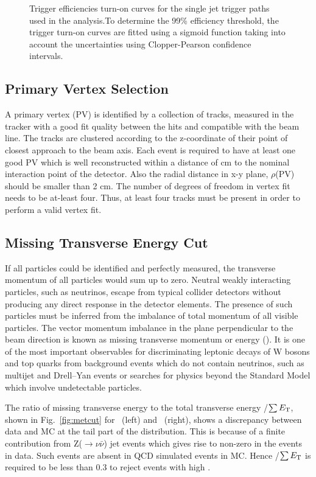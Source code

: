 \begin{figure}[!htbp]
\begin{center}
 \caption{Trigger efficiencies turn-on curves for the single jet trigger paths used in the analysis.To determine the 99\% efficiency threshold, the trigger turn-on curves are fitted using a sigmoid function taking into account the uncertainties using Clopper-Pearson confidence intervals.}
 \label{fig:trig_eff}
 \end{center}
\end{figure}

\subsection{Primary Vertex Selection}
A primary vertex (PV) is identified by a collection of tracks, measured in the tracker with a good fit quality between the hits and compatible with the beam line. The tracks are clustered according to the z-coordinate of their point of closest approach to the beam axis. Each event is required to have at least one good PV which is well reconstructed within a distance of  cm to the nominal interaction point of the detector. Also the radial distance in x-y plane, $\rho$(PV) should be smaller than 2 cm. The number of degrees of freedom in vertex fit needs to be at-least four. Thus, at least four tracks must be present in order to perform a valid vertex fit.

\subsection{Missing Transverse Energy Cut}
If all particles could be identified and perfectly measured, the transverse momentum of all particles would sum up to zero. Neutral weakly interacting particles, such as neutrinos, escape from typical collider detectors without producing any direct response in the detector elements. The presence of such particles must be inferred from the imbalance of total momentum of all visible particles. The vector momentum imbalance in the plane perpendicular to the beam direction is known as missing transverse momentum or energy (\ETmiss). It is one of the most important observables for discriminating leptonic decays of W bosons and top quarks from background events which do not contain neutrinos, such  as multijet and Drell–Yan events or searches for physics beyond the Standard Model which involve undetectable particles.

The ratio of missing transverse energy to the total transverse energy \ETmiss/$\sum E_{\mathrm{T}}$, shown in Fig.~\ref{fig:metcut} for \njt~(left) and \njth~(right), shows a discrepancy between data and MC at the tail part of the distribution. This is because of a  finite contribution from Z($\rightarrow \nu \bar{\nu}$) \plus jet events which gives rise to non-zero \ET in the events in data. Such events are absent in QCD simulated events in MC. Hence \ETmiss/$\sum E_{\mathrm{T}}$ is required to be less than 0.3 to reject events with high \ETmiss.

